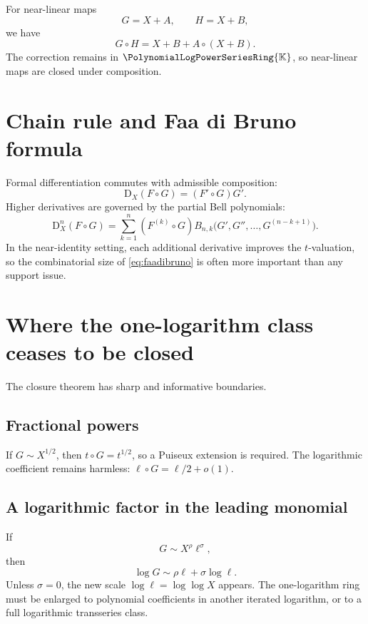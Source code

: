 \documentclass[11pt,oneside,openany]{book}
\newcommand{\K}{\mathbb{K}}
\newcommand{\Rring}{\PolynomialLogPowerSeriesRing{\K}}
\newcommand{\compose}{\mathbin{\circ}}
\newcommand{\D}{\mathrm{D}}
\begin{document}
For near-linear maps
\[
 G=X+A,
 \qquad H=X+B,
\]
we have
\begin{equation}\label{eq:nearlineargrouplaw}
 G\compose H=X+B+A\compose(X+B).
\end{equation}
The correction remains in \(\Rring\), so near-linear maps are closed under
composition.

\section{Chain rule and Faa di Bruno formula}
Formal differentiation commutes with admissible composition:
\begin{equation}\label{eq:chainrule}
 \D_X(F\compose G)=(F'\compose G)G'.
\end{equation}
Higher derivatives are governed by the partial Bell polynomials:
\begin{equation}\label{eq:faadibruno}
 \D_X^n(F\compose G)
 =\sum_{k=1}^{n}(F^{(k)}\compose G)
 B_{n,k}\bigl(G',G'',\ldots,G^{(n-k+1)}\bigr).
\end{equation}
In the near-identity setting, each additional derivative improves the
\(t\)-valuation, so the combinatorial size of \cref{eq:faadibruno} is often more
important than any support issue.

\section{Where the one-logarithm class ceases to be closed}
The closure theorem has sharp and informative boundaries.

\subsection{Fractional powers}
If \(G\sim X^{1/2}\), then \(t\compose G=t^{1/2}\), so a Puiseux extension is
required.  The logarithmic coefficient remains harmless:
\(\ell\compose G=\ell/2+o(1)\).

\subsection{A logarithmic factor in the leading monomial}
If
\[
 G\sim X^\rho\ell^\sigma,
\]
then
\begin{equation}\label{eq:logfactorcomposition}
 \log G\sim\rho\ell+\sigma\log\ell.
\end{equation}
Unless \(\sigma=0\), the new scale \(\log\ell=\log\log X\) appears.  The
one-logarithm ring must be enlarged to polynomial coefficients in another
iterated logarithm, or to a full logarithmic transseries class.
\end{document}
